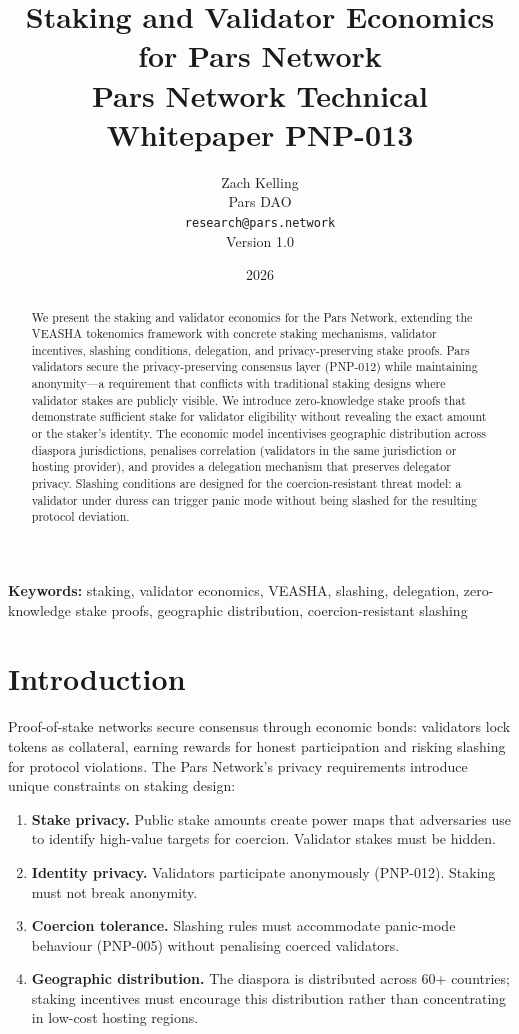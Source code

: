 \documentclass[11pt,a4paper]{article}
\title{%
    \textbf{Staking and Validator Economics\\
    for Pars Network}\\[0.5em]
    \large Pars Network Technical Whitepaper PNP-013
}
\author{%
    Zach Kelling\\
    Pars DAO\\
    \texttt{research@pars.network}\\[0.5em]
    \small Version 1.0
}
\date{2026}
\begin{document}
\parscoverpage

\thispagestyle{fancy}

\begin{abstract}
\noindent
We present the staking and validator economics for the Pars Network,
extending the VEASHA tokenomics framework with concrete staking
mechanisms, validator incentives, slashing conditions, delegation, and
privacy-preserving stake proofs.  Pars validators secure the
privacy-preserving consensus layer (PNP-012) while maintaining
anonymity---a requirement that conflicts with traditional staking designs
where validator stakes are publicly visible.  We introduce
zero-knowledge stake proofs that demonstrate sufficient stake for
validator eligibility without revealing the exact amount or the
staker's identity.  The economic model incentivises geographic
distribution across diaspora jurisdictions, penalises correlation
(validators in the same jurisdiction or hosting provider), and provides
a delegation mechanism that preserves delegator privacy.  Slashing
conditions are designed for the coercion-resistant threat model: a
validator under duress can trigger panic mode without being slashed for
the resulting protocol deviation.
\end{abstract}

\vspace{1em}
\noindent\textbf{Keywords:} staking, validator economics, VEASHA,
slashing, delegation, zero-knowledge stake proofs, geographic
distribution, coercion-resistant slashing

\tableofcontents
\newpage

\section{Introduction}
\label{sec:intro}

Proof-of-stake networks secure consensus through economic bonds:
validators lock tokens as collateral, earning rewards for honest
participation and risking slashing for protocol violations.  The Pars
Network's privacy requirements introduce unique constraints on staking
design:

\begin{enumerate}
    \item \textbf{Stake privacy.}  Public stake amounts create power
    maps that adversaries use to identify high-value targets for
    coercion.  Validator stakes must be hidden.
    \item \textbf{Identity privacy.}  Validators participate
    anonymously (PNP-012).  Staking must not break anonymity.
    \item \textbf{Coercion tolerance.}  Slashing rules must
    accommodate panic-mode behaviour (PNP-005) without penalising
    coerced validators.
    \item \textbf{Geographic distribution.}  The diaspora is distributed
    across 60+ countries; staking incentives must encourage this
    distribution rather than concentrating in low-cost hosting regions.
\end{enumerate}
\end{document}
